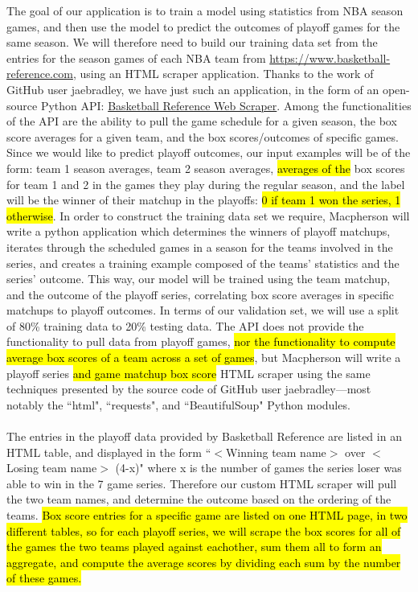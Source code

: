\documentclass[letterpaper]{article} %
\begin{document}
The goal of our application is to train a model using statistics from NBA season games, and then use the model to predict the outcomes of playoff games for the same season. We will therefore need to build our training data set from the entries for the season games of each NBA team from \href{https://www.basketball-reference.com}{https://www.basketball-reference.com}, using an HTML scraper application. Thanks to the work of GitHub user jaebradley, we have just such an application, in the form of an open-source Python API: \href{https://github.com/jaebradley/basketball_reference_web_scraper}{Basketball Reference Web Scraper}. Among the functionalities of the API are the ability to pull the game schedule for a given season, the box score averages for a given team, and the box scores/outcomes of specific games. Since we would like to predict playoff outcomes, our input examples will be of the form: team 1 season averages, team 2 season averages, \hl{averages of the} box scores for team 1 and 2 in the games they play during the regular season, and the label will be the winner of their matchup in the playoffs: \hl{0 if team 1 won the series, 1 otherwise}. In order to construct the training data set we require, Macpherson will write a python application which determines the winners of playoff matchups, iterates through the scheduled games in a season for the teams involved in the series, and creates a training example composed of the teams’ statistics and the series’ outcome. This way, our model will be trained using the team matchup, and the outcome of the playoff series, correlating box score averages in specific matchups to playoff outcomes. In terms of our validation set, we will use a split of 80\% training data to 20\% testing data. The API does not provide the functionality to pull data from playoff games, \hl{nor the functionality to compute average box scores of a team across a set of games}, but Macpherson will write a playoff series \hl{and game matchup box score} HTML scraper using the same techniques presented by the source code of GitHub user jaebradley---most notably the ``html", ``requests", and ``BeautifulSoup" Python modules. \\ \hl{  } \\ 
The entries in the playoff data provided by Basketball Reference are listed in an HTML table, and displayed in the form ``$<$Winning team name$>$ over $<$Losing team name$>$ (4-x)" where x is the number of games the series loser was able to win in the 7 game series. Therefore our custom HTML scraper will pull the two team names, and determine the outcome based on the ordering of the teams. \hl{Box score entries for a specific game are listed on one HTML page, in two different tables, so for each playoff series, we will scrape the box scores for all of the games the two teams played against eachother, sum them all to form an aggregate, and compute the average scores by dividing each sum by the number of these games.} \\ \hl{  } \\
\end{document}
